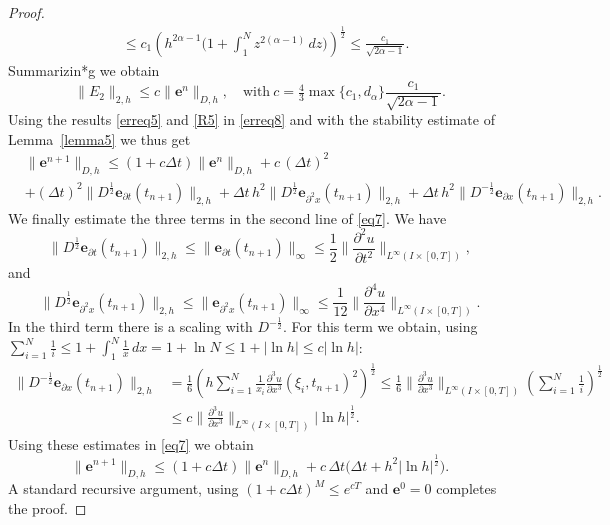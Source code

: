 \documentclass[10pt,a4paper]{amsart}
\newcommand{\be}{\mathbf e}
\begin{document}
\begin{proof}
\begin{align*}
 & \leq c_1 \left(h^{2 \alpha -1}\big( 1+ \int_1^{N} z^{2 (\alpha-1)}\, dz \big) \right)^\frac12 \leq \frac{c_1}{\sqrt{2 \alpha -1}}.
\end{align*}
Summarizin*g we obtain
\begin{equation} \label{R5}
   \|E_2\|_{2,h} \leq c \|\be^n\|_{D,h}, \quad \text{with}~ c= \tfrac43 \max\{c_1, d_\alpha\}\frac{c_1}{\sqrt{2 \alpha -1}}.
\end{equation}
Using  the results \eqref{erreq5} and \eqref{R5} in \eqref{erreq8} and with the stability estimate of Lemma~\ref{lemma5} we thus get  
\begin{equation}\label{eq7} \begin{split}
 & \|\be^{n+1}\|_{D,h} \leq (1 + c \Delta t)\|\be^n\|_{D,h} + c\, (\Delta t)^2 \\
  & + (\Delta t)^2 \|D^\frac12 \be_{\partial t}(t_{n+1})\|_{2,h} +  \Delta t\, h^2\| D^\frac12\be_{\partial^2 x}(t_{n+1})\|_{2,h}+ \Delta t\, h^2 \|D^{-\frac12}\be_{\partial x}(t_{n+1})\|_{2,h}.
\end{split} \end{equation}
We finally estimate the three terms in the second line of \eqref{eq7}. We have
\[ \|D^\frac12 \be_{\partial t}(t_{n+1})\|_{2,h} \leq \|\be_{\partial t}(t_{n+1})\|_\infty \leq \frac12 \| \frac{\partial^2 u}{\partial t^2}\|_{L^\infty(I\times[0,T])},
\]
and  
\[
 \| D^\frac12\be_{\partial^2 x}(t_{n+1})\|_{2,h} \leq \| \be_{\partial^2 x}(t_{n+1})\|_\infty \leq \frac{1}{12}\|\frac{\partial^4 u}{\partial  x^4}\|_{L^\infty(I\times[0,T])}.
\]
In  the third term there is a scaling with $D^{-\frac12}$. For this term we obtain, using $\sum_{i=1}^N \frac{1}{i} \leq 1 +\int_1^N \frac{1}{x} \, dx = 1 + \ln N \leq 1 + |\ln h| \leq c |\ln h|$:
\[ \begin{split} 
  \|D^{-\frac12}\be_{\partial x}(t_{n+1})\|_{2,h} & = \frac16 \left( h \sum_{i=1}^N \frac{1}{x_i} \frac{\partial^3 u}{\partial x^3}(\xi_i,t_{n+1})^2 \right)^\frac12 
   \leq \frac{1}{6}\|\frac{\partial^3 u}{\partial  x^3}\|_{L^\infty(I\times[0,T])} \left( \sum_{i=1}^N \frac{1}{i}\right)^\frac12 \\
  & \leq c \|\frac{\partial^3 u}{\partial  x^3}\|_{L^\infty(I\times[0,T])} |\ln h|^\frac12.
\end{split} \]
Using these estimates in \eqref{eq7} we obtain
\[
  \|\be^{n+1}\|_{D,h} \leq (1 + c \Delta t)\|\be^n\|_{D,h} + c\, \Delta t \big( \Delta t + h^2 |\ln h|^\frac12\big).
\]
A standard recursive argument, using $(1+ c \Delta t)^M \leq e^{c T}$ and $\be^0=0$ completes the proof.
\end{proof}
\end{document}
